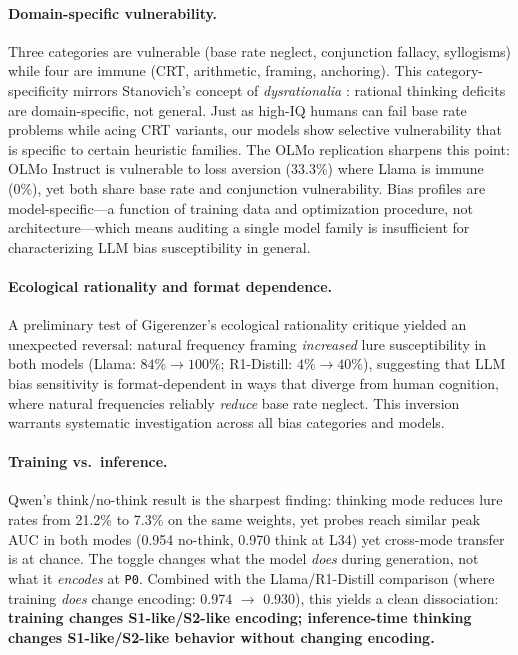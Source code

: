 \documentclass[twocolumn,10pt]{article}
\newcommand{\sone}{S1-like}
\newcommand{\stwo}{S2-like}
\newcommand{\pzero}{\texttt{P0}}
\begin{document}
\paragraph{Domain-specific vulnerability.}
Three categories are vulnerable (base rate neglect, conjunction fallacy,
syllogisms) while four are immune (CRT, arithmetic, framing, anchoring).
This category-specificity mirrors Stanovich's concept of \emph{dysrationalia}
\citep{stanovich2016rationality}: rational thinking deficits are
domain-specific, not general.  Just as high-IQ humans can fail base rate
problems while acing CRT variants, our models show selective vulnerability
that is specific to certain heuristic families.  The OLMo replication
sharpens this point: OLMo Instruct is vulnerable to loss aversion
(33.3\%) where Llama is immune (0\%), yet both share base rate and
conjunction vulnerability.  Bias profiles are model-specific---a function
of training data and optimization procedure, not architecture---which
means auditing a single model family is insufficient for characterizing
LLM bias susceptibility in general.

\paragraph{Ecological rationality and format dependence.}
A preliminary test of Gigerenzer's ecological rationality critique
\citep{gigerenzer1995improve} yielded an unexpected reversal: natural
frequency framing \emph{increased} lure susceptibility in both models
(Llama: $84\% \to 100\%$; R1-Distill: $4\% \to 40\%$), suggesting
that LLM bias sensitivity is format-dependent in ways that diverge from
human cognition, where natural frequencies reliably \emph{reduce}
base rate neglect.  This inversion warrants systematic investigation
across all bias categories and models.

\paragraph{Training vs.\ inference.}
Qwen's think/no-think result is the sharpest finding: thinking mode
reduces lure rates from 21.2\% to 7.3\% on the same weights, yet probes
reach similar peak AUC in both modes (0.954 no-think, 0.970 think at L34) yet cross-mode transfer is at chance.  The toggle
changes what the model \emph{does} during generation, not what it
\emph{encodes} at \pzero{}.  Combined with the Llama/R1-Distill comparison
(where training \emph{does} change encoding: 0.974 $\to$ 0.930), this
yields a clean dissociation: \textbf{training changes \sone{}/\stwo{}
encoding; inference-time thinking changes \sone{}/\stwo{} behavior
without changing encoding.}
\end{document}
